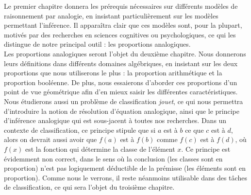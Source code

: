 Le premier chapitre donnera les prérequis nécessaires sur différents modèles de
raisonnement par analogie, en insistant particulièrement sur les modèles
permettant l'inférence. Il apparaîtra clair que ces modèles sont, pour la
plupart, motivés par des recherches en sciences cognitives ou psychologiques,
ce qui les distingue de notre principal outil : les proportions analogiques.\\

Les proportions analogiques seront l'objet du deuxième chapitre. Nous donnerons
leurs définitions dans différents domaines algébriques, en insistant sur les
deux proportions que nous utiliserons le plus : la proportion arithmétique et
la proportion booléenne. De plus, nous essaierons d'aborder ces proportions
d'un point de vue géométrique afin d'en mieux saisir les différentes
caractéristiques. Nous étudierons aussi un problème de classification
\textit{jouet}, ce qui nous permettra d'introduire la notion de résolution
d'équation analogique, ainsi que le principe d'inférence analogique qui est
sous-jacent à toutes  nos recherches. Dans un contexte de classification, ce
principe stipule que si $a$ est à $b$ ce que $c$ est à $d$, alors on devrait
aussi avoir que $f(a)$ est à $f(b)$ comme $f(c)$ est à $f(d)$, où $f(x)$ est la
fonction qui détermine la classe de l'élément $x$. Ce principe est évidemment
non correct, dans le sens où la conclusion (les classes sont en proportion)
n'est pas logiquement déductible de la prémisse (les éléments sont en
proportion). Comme nous le verrons, il reste néanmoins utilisable dans des
tâches de classification, ce qui sera l'objet du troisième chapitre.\\


